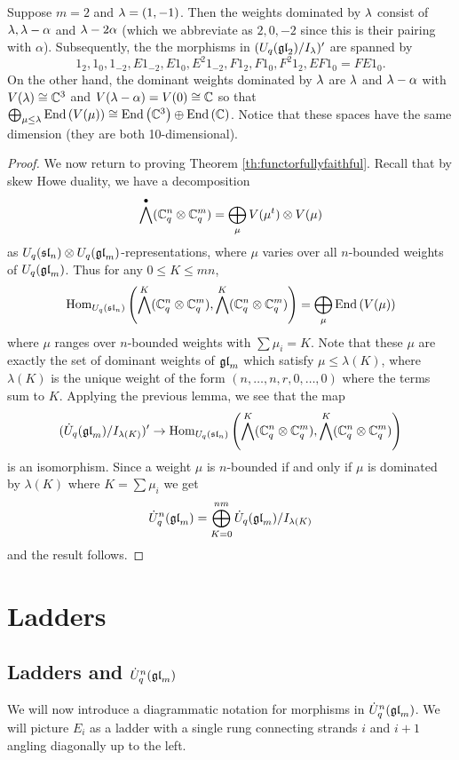 \documentclass[11pt,leqno]{article}
\begin{document}
 Suppose $m=2$ and $\lambda = (1,-1)$. Then the weights dominated by $\lambda$ consist of $\lambda, \lambda - \alpha$ and $\lambda-2\alpha$ (which we abbreviate as $2,0,-2$ since this is their pairing with $\alpha$). Subsequently, the the morphisms in $(U_q({\mathfrak{gl}}_2)/I_\lambda)'$ are spanned by 
$$1_2, 1_0, 1_{-2}, E 1_{-2}, E1_0, E^2 1_{-2}, F1_2, F1_0, F^2 1_2, EF1_0 = FE1_0.$$
On the other hand, the dominant weights dominated by $\lambda$ are $\lambda$ and $\lambda-\alpha$ with $V(\lambda) \cong {\mathbb{C}}^3$ and $V(\lambda-\alpha)=V(0) \cong {\mathbb{C}}$ so that $\bigoplus_{\mu \le \lambda} \operatorname{End}\left(V(\mu)\right) \cong \operatorname{End}\left({\mathbb{C}}^3\right) \oplus \operatorname{End}\left({\mathbb{C}}\right)$. Notice that these spaces have the same dimension (they are both 10-dimensional). 

\begin{proof}
We now return to proving Theorem \ref{th:functorfullyfaithful}. Recall that by skew Howe duality, we have a decomposition
$$ \bigwedge^\bullet ({\mathbb{C}}_q^n \otimes {\mathbb{C}}_q^m) = \bigoplus_{\mu} V(\mu^t) \otimes V(\mu) $$
as $U_q({\mathfrak{sl}}_n) \otimes U_q({\mathfrak{gl}}_m)$-representations, where $\mu$ varies over all $n$-bounded weights of $U_q({\mathfrak{gl}}_m)$. Thus for any $ 0 \le K \le mn $,
$$ \operatorname{Hom}_{U_q({\mathfrak{sl}}_n)} \left(\bigwedge^K({\mathbb{C}}_q^n \otimes {\mathbb{C}}_q^m), \bigwedge^K({\mathbb{C}}_q^n \otimes {\mathbb{C}}_q^m)\right) = \bigoplus_{\mu} \operatorname{End}\left(V(\mu)\right) $$
where $ \mu $ ranges over $ n$-bounded weights with $ \sum \mu_i = K $.  Note that these $\mu $ are exactly the set of dominant weights of $ {\mathfrak{gl}}_m $ which satisfy $ \mu \le \lambda(K) $, where $ \lambda(K) $ is the unique weight of the form $(n, \dots, n, r, 0, \dots, 0) $ where the terms sum to $K$.  Applying the previous lemma, we see that the map
$$ (\dot{{{U}}}_q({\mathfrak{gl}}_m)/I_{\lambda(K)})' \rightarrow \operatorname{Hom}_{U_q({\mathfrak{sl}}_n)} \left(\bigwedge^K({\mathbb{C}}_q^n \otimes {\mathbb{C}}_q^m), \bigwedge^K({\mathbb{C}}_q^n \otimes {\mathbb{C}}_q^m)\right) $$
is an isomorphism. Since a weight $ \mu $ is $n$-bounded if and only if $ \mu $ is dominated by $ \lambda(K) $ where $ K = \sum \mu_i $ we get 
$$ \dot{{{U}}}_q^n({\mathfrak{gl}}_m) = \bigoplus_{K=0}^{nm} \dot{{{U}}}_q({\mathfrak{gl}}_m)/I_{\lambda(K)} $$
and the result follows.
\end{proof}

\section{Ladders}
\label{sec:ladders}

\subsection{Ladders and $\dot{{{U}}}_q^n({\mathfrak{gl}}_m)$ }
We will now introduce a diagrammatic notation for morphisms in $ \dot{{{U}}}_q^n({\mathfrak{gl}}_m)$.  We will picture $E_i $ as a ladder with a single rung connecting strands $ i $ and $ i+1 $ angling  diagonally up to the left.
\end{document}
